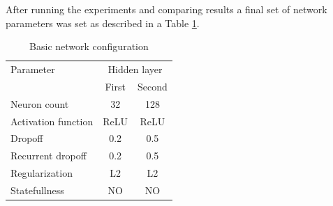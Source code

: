 \documentclass{kybernetika}
\begin{document}
After running the experiments and comparing results a final set of network parameters was set
as described in a Table \ref{tab:final_config}.
\begin{table}[htb] 
	\centering
	\caption{Basic network configuration}
	\label{tab:final_config}
	\begin{tabular}{lcc}
		\hline
		\hline
		Parameter& \multicolumn{2}{c}{Hidden layer}  \\
		&First&Second\\
		\hline
		Neuron count & 32 & 128  \\
		Activation function & ReLU & ReLU  \\
		Dropoff & 0.2 & 0.5   \\
		Recurrent dropoff & 0.2 & 0.5   \\
		Regularization & L2 & L2   \\
		Statefullness & NO & NO   \\
		\hline
		\hline
	\end{tabular}
\end{table}

\end{document}
